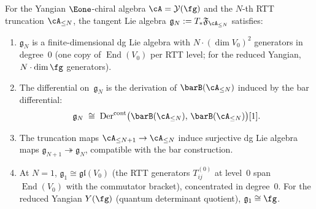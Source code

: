 \begin{proposition}
\label{prop:finite-stage-tangent}
For the Yangian $\Eone$-chiral algebra
$\cA = \mathcal{Y}(\fg)$ and the $N$-th RTT truncation
$\cA_{\leq N}$, the tangent Lie algebra
$\mathfrak{g}_N := T_{*}\mathfrak{F}_{\cA_{\leq N}}$
satisfies:
\begin{enumerate}[label=\textup{(\alph*)}]
\item $\mathfrak{g}_N$ is a finite-dimensional dg Lie algebra
  with $N \cdot (\dim V_0)^2$ generators in degree~$0$
  \textup{(}one copy of $\operatorname{End}(V_0)$ per RTT
  level; for the reduced Yangian, $N \cdot \dim \fg$
  generators\textup{)}.
\item The differential on~$\mathfrak{g}_N$ is the derivation
  of $\barB(\cA_{\leq N})$ induced by the bar differential:
  \[
  \mathfrak{g}_N
  \;\cong\;
  \operatorname{Der}^{\mathrm{cont}}\bigl(
    \barB(\cA_{\leq N}),\, \barB(\cA_{\leq N})
  \bigr)[1].
  \]
\item The truncation maps $\cA_{\leq N+1} \to \cA_{\leq N}$
  induce surjective dg Lie algebra maps
  $\mathfrak{g}_{N+1} \twoheadrightarrow \mathfrak{g}_N$,
  compatible with the bar construction.
\item At $N = 1$, $\mathfrak{g}_1 \cong \mathfrak{gl}(V_0)$
  \textup{(}the RTT generators $T_{ij}^{(0)}$ at level~$0$ span
  $\operatorname{End}(V_0)$ with the commutator bracket\textup{)},
  concentrated in degree~$0$.  For the reduced Yangian
  $Y(\fg)$ \textup{(}quantum determinant quotient\textup{)},
  $\mathfrak{g}_1 \cong \fg$.
\end{enumerate}
\end{proposition}

